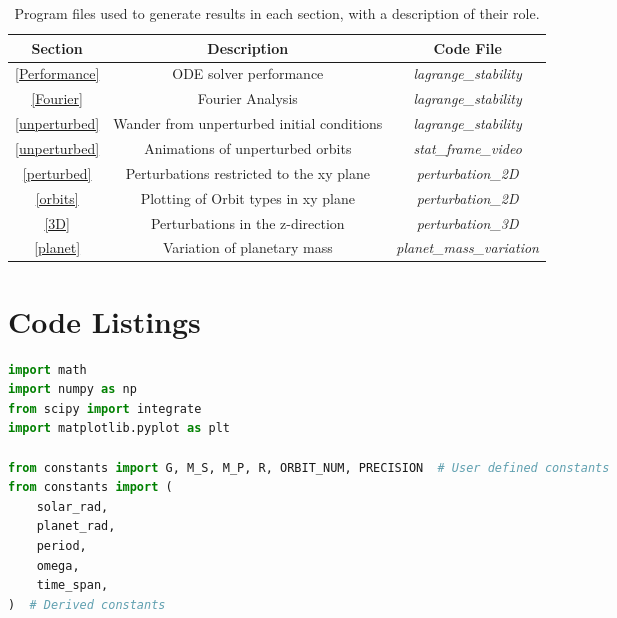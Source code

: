 \documentclass[11pt, a4paper,twocolumn]{article} %
\begin{document}
\begin{appendices}
\begin{table}[ht]
	\caption{Program files used to generate results in each section, with a description of their role.}
	\centering
	\begin{tabular}{|c|c|c|}
		\hline
		\textbf{Section} & \textbf{Description} & \textbf{Code File} \\
		\hline \hline
		\ref{Performance} & ODE solver performance & \textit{lagrange\_stability} \\
		\hline
		\ref{Fourier} & Fourier Analysis & \textit{lagrange\_stability} \\
		\hline
		\ref{unperturbed} & Wander from unperturbed initial conditions & \textit{lagrange\_stability} \\
		\hline
		\ref{unperturbed} & Animations of unperturbed orbits & \textit{stat\_frame\_video} \\
		\hline
		\ref{perturbed}& Perturbations restricted to the xy plane & \textit{perturbation\_2D} \\
		\hline
		\ref{orbits}& Plotting of Orbit types in xy plane & \textit{perturbation\_2D} \\
		\hline
		\ref{3D}& Perturbations in the z-direction & \textit{perturbation\_3D} \\
		\hline
		\ref{planet}& Variation of planetary mass & \textit{planet\_mass\_variation} \\
		\hline
	\end{tabular}
	\label{Codefiles}
\end{table}



\section{Code Listings} \label{Code}
\begin{lstlisting}[language=Python]
import math
import numpy as np
from scipy import integrate
import matplotlib.pyplot as plt

from constants import G, M_S, M_P, R, ORBIT_NUM, PRECISION  # User defined constants
from constants import (
	solar_rad,
	planet_rad,
	period,
	omega,
	time_span,
)  # Derived constants


\end{lstlisting}

\end{appendices}
\end{document}
